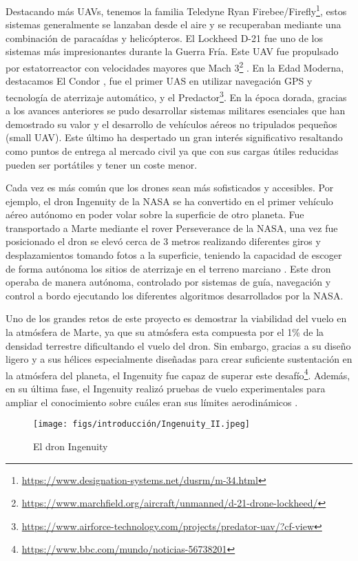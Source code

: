 Destacando más UAVs, tenemos la familia Teledyne Ryan Firebee/Firefly\footnote{\url{https://www.designation-systems.net/dusrm/m-34.html}}, estos sistemas generalmente se lanzaban 
desde el aire y se recuperaban mediante una combinación de paracaídas y helicópteros. El Lockheed D-21 fue uno de los sistemas más impresionantes durante la Guerra Fría. 
Este UAV fue propulsado por estatorreactor con velocidades mayores que Mach 3\footnote{\url{https://www.marchfield.org/aircraft/unmanned/d-21-drone-lockheed/}} . 
En la Edad Moderna, destacamos El Condor \cite{CondorUAV}, fue el primer UAS en utilizar navegación GPS y tecnología de aterrizaje automático, y el Predactor\footnote{\url{https://www.airforce-technology.com/projects/predator-uav/?cf-view}}. 
En la época dorada, gracias a los avances anteriores se pudo desarrollar sistemas militares esenciales que han demostrado su valor y el desarrollo de vehículos aéreos no 
tripulados pequeños (small UAV). Este último ha despertado un gran interés significativo resaltando como puntos de entrega al mercado civil ya que con sus cargas útiles
reducidas pueden ser portátiles y tener un coste menor. 

Cada vez es más común que los drones sean más sofisticados y accesibles. Por ejemplo, el dron Ingenuity de la NASA se ha convertido en el primer vehículo aéreo autónomo en poder volar
sobre la superficie de otro planeta. Fue transportado a Marte mediante el rover Perseverance de la NASA, una vez fue posicionado el dron se elevó cerca de 3 metros realizando 
diferentes giros y desplazamientos tomando fotos a la superficie, teniendo la capacidad de escoger de forma autónoma los sitios de aterrizaje en el terreno marciano \cite{nasa2022ingenuity}.
Este dron operaba de manera autónoma, controlado por sistemas de guía, navegación y control a bordo ejecutando los diferentes algoritmos desarrollados por la NASA. 

Uno de los grandes retos de este proyecto es demostrar la viabilidad del vuelo en la atmósfera de Marte, ya que su atmósfera esta compuesta por el 1\% de la densidad terrestre
dificultando el vuelo del dron. Sin embargo, gracias a su diseño ligero y a sus hélices especialmente diseñadas para crear suficiente sustentación en la atmósfera del planeta, el Ingenuity 
fue capaz de superar este desafío\footnote{\url{https://www.bbc.com/mundo/noticias-56738201}}. Además, en su última fase, el Ingenuity realizó pruebas de vuelo experimentales para ampliar el conocimiento sobre cuáles eran sus límites aerodinámicos \cite{nasa2022perseverance}.
\begin{figure} [H]
  \begin{center}
    \texttt{[image: figs/introducción/Ingenuity\_II.jpeg]}
  \end{center}
  \caption{El dron Ingenuity}
  \label{fig:Ingenuity}
  \vspace{-1.5em}
\end{figure}



